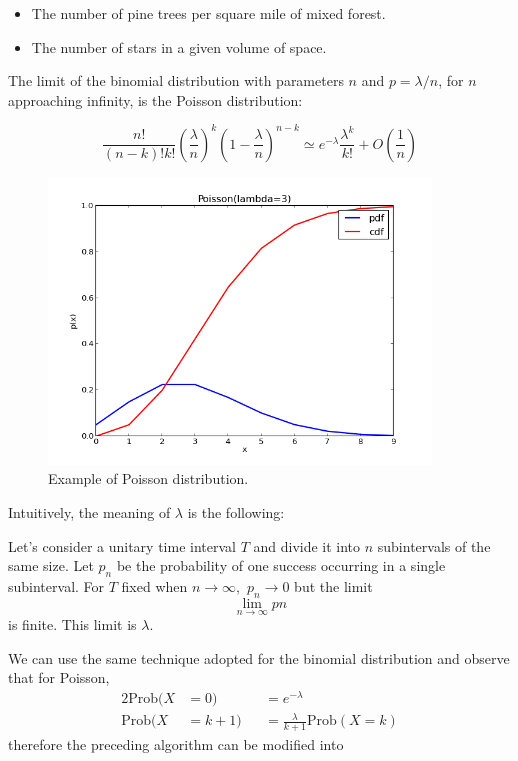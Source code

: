 \documentclass[justified,sixbynine]{tufte-book}
\theoremstyle{plain}%
\theoremstyle{definition}
\theoremstyle{remark}
\begin{document}
\begin{fullwidth}
\begin{itemize}
\item  The number of pine trees per square mile of mixed forest.

\item  The number of stars in a given volume of space.
\end{itemize}

The limit of the binomial distribution with parameters $n$ and $p=\lambda /n$, for $n$ approaching infinity, is the Poisson distribution:

\begin{equation}
\frac{n!}{(n-k)!k!}\left( \frac \lambda n\right) ^k\left( 1-\frac \lambda
n\right) ^{n-k}\simeq e^{-\lambda }\frac{\lambda ^k}{k!}+O(\frac 1n)
\end{equation}

\begin{figure}[ht]
\centering\includegraphics[width=4in]{images/poisson.png}
\caption{Example of Poisson distribution.}
\end{figure}

Intuitively, the meaning of $\lambda $ is the following:

Let's consider a unitary time interval $T$ and divide it into
$n$ subintervals of the same size.
Let $p_n$ be the probability of one success occurring in a single
subinterval. For $T$ fixed when $n\rightarrow \infty ,$ $p_n\rightarrow 0$
but the limit
\begin{equation}
\lim_{n\rightarrow \infty }pn
\end{equation}
is finite. This limit is $\lambda $.

We can use the same technique adopted for the
binomial distribution and observe that for Poisson,
\begin{alignat}{2}
\textrm{Prob}(X &= 0) &&= e^{-\lambda } \\
\textrm{Prob}(X &= k+1) &&= \frac{\lambda }{k+1}\textrm{Prob}(X=k)
\end{alignat}
therefore the preceding algorithm can be modified into


\end{fullwidth}
\end{document}

